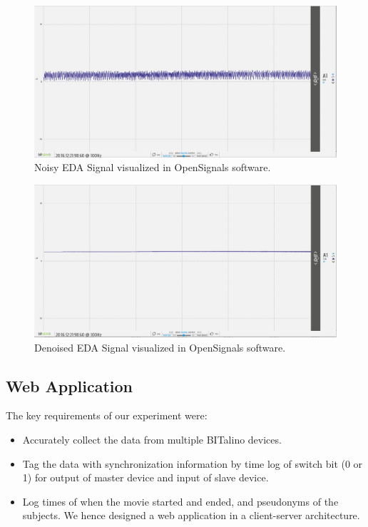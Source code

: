 \begin{figure}
\centering
\includegraphics[width=130mm]{Figures/eda_noisy.PNG}
\caption{Noisy EDA Signal visualized in OpenSignals software.}
\label{fig:eda_noisy}
\end{figure}

\begin{figure}
\centering
\includegraphics[width=130mm]{Figures/eda_nonnoisy.PNG}
\caption{Denoised EDA Signal visualized in OpenSignals software.}
\label{fig:eda_nonnoisy}
\end{figure}

\subsection{Web Application}
\label{sec:custom_int}
The key requirements of our experiment were: 
\begin{itemize}
    \item Accurately collect the data from multiple BITalino devices.
    \item Tag the data with synchronization information by time log of switch bit (0 or 1) for output of master device and input of slave device.
    \item Log times of when the movie started and ended, and pseudonyms of the subjects. We hence designed a web application in a client-server architecture.
\end{itemize}
